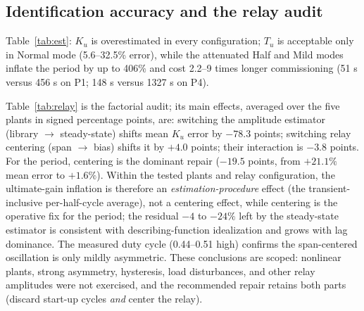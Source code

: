 \documentclass[10pt,twocolumn]{article}
\begin{document}
\subsection{Identification accuracy and the relay audit}
\label{sec:relayaudit}

Table~\ref{tab:est}: $K_u$ is overestimated in every configuration; $T_u$ is acceptable only in Normal mode (5.6--32.5\% error), while the attenuated Half and Mild modes inflate the period by up to 406\% and cost 2.2--9 times longer commissioning (51 s versus 456 s on P1; 148 s versus 1327 s on P4).

\begin{table}[t]
\centering
\caption{Relay identification accuracy against analytic critical points, per oscillation mode (library pipeline).}
\label{tab:est}
\scriptsize
\setlength{\tabcolsep}{2.5pt}

\end{table}

Table~\ref{tab:relay} is the factorial audit; its main effects, averaged over the five plants in signed percentage points, are: switching the amplitude estimator (library $\to$ steady-state) shifts mean $K_u$ error by $-78.3$ points; switching relay centering (span $\to$ bias) shifts it by $+4.0$ points; their interaction is $-3.8$ points. For the period, centering is the dominant repair ($-19.5$ points, from $+21.1\%$ mean error to $+1.6\%$). Within the tested plants and relay configuration, the ultimate-gain inflation is therefore an \emph{estimation-procedure} effect (the transient-inclusive per-half-cycle average), not a centering effect, while centering is the operative fix for the period; the residual $-4$ to $-24\%$ left by the steady-state estimator is consistent with describing-function idealization and grows with lag dominance. The measured duty cycle (0.44--0.51 high) confirms the span-centered oscillation is only mildly asymmetric. These conclusions are scoped: nonlinear plants, strong asymmetry, hysteresis, load disturbances, and other relay amplitudes were not exercised, and the recommended repair retains both parts (discard start-up cycles \emph{and} center the relay).

\begin{table}[t]
\centering
\caption{Factorial relay audit (Normal mode), errors relative to analytic truth. Columns: the library pipeline (lib.); the independent steady-state estimator on the same trace (steady); a bias-centered relay with the library's estimation procedure (bias); and their combination (bias+steady). Raw traces for every row are released as CSV.}
\label{tab:relay}
\scriptsize
\setlength{\tabcolsep}{3pt}

\end{table}
\end{document}
